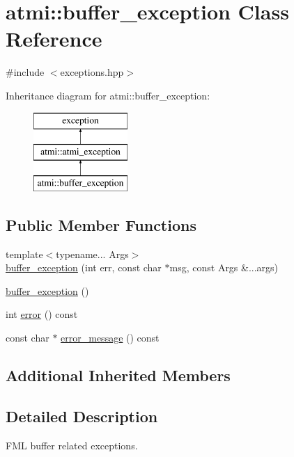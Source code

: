 \hypertarget{classatmi_1_1buffer__exception}{}\section{atmi\+:\+:buffer\+\_\+exception Class Reference}
\label{classatmi_1_1buffer__exception}


{\ttfamily \#include $<$exceptions.\+hpp$>$}

Inheritance diagram for atmi\+:\+:buffer\+\_\+exception\+:\begin{figure}[H]
\begin{center}
\leavevmode
\includegraphics[height=3.000000cm]{classatmi_1_1buffer__exception}
\end{center}
\end{figure}
\subsection*{Public Member Functions}
\begin{DoxyCompactItemize}
\item 
{\footnotesize template$<$typename... Args$>$ }\\\hyperlink{classatmi_1_1buffer__exception_aff48a3528d8a2d575a194233f454bd40}{buffer\+\_\+exception} (int err, const char $\ast$msg, const Args \&...args)
\item 
\hyperlink{classatmi_1_1buffer__exception_a25ef1cb87d75bfca1577f298466e77a0}{buffer\+\_\+exception} ()
\item 
int \hyperlink{classatmi_1_1buffer__exception_a8d9475dbaa7d9864b906dc6ea9818351}{error} () const 
\item 
const char $\ast$ \hyperlink{classatmi_1_1buffer__exception_a6881332c2a607fb71b987eaf811723b7}{error\+\_\+message} () const 
\end{DoxyCompactItemize}
\subsection*{Additional Inherited Members}


\subsection{Detailed Description}
F\+M\+L buffer related exceptions. 

